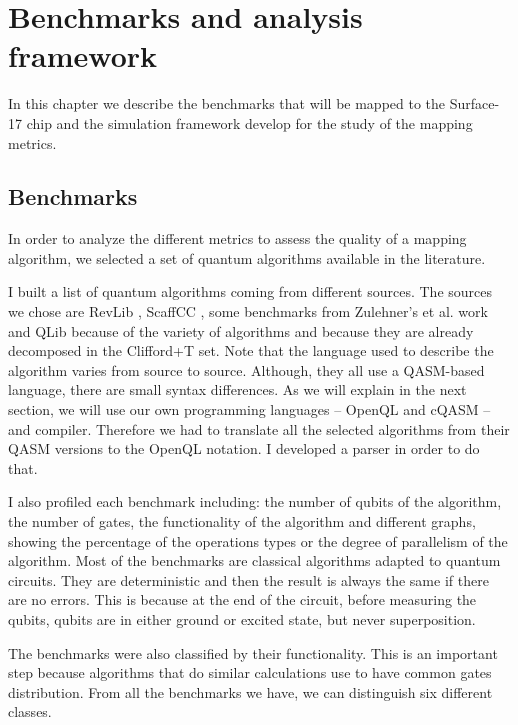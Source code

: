 
\chapter{Benchmarks and analysis framework}
\label{sec:org17c0cef}

In this chapter we describe the benchmarks that will be mapped to the Surface-17 chip and the simulation framework develop for the study of the mapping metrics.

\section{Benchmarks}
\label{sec:orga02804b}
In order to analyze the different metrics to assess the quality of a mapping algorithm, we selected a set of quantum algorithms available in the literature.

I built a list of quantum algorithms coming from different sources.
The sources we chose are RevLib \cite{Wille_2008}, ScaffCC \cite{JavadiAbhari_2015}, some benchmarks from Zulehner's et al. work \cite{zulehner17:effic_method_mappin_quant_circuit} and QLib \cite{Lin_2014} because of the variety of algorithms and because they are already decomposed in the Clifford+T set.
Note that the language used to describe the algorithm varies from source to source.
Although, they all use a  QASM-based language, there are small syntax differences.
As we will explain in the next section, we will use our own programming languages -- OpenQL and cQASM -- and compiler.
Therefore we had to translate all the selected algorithms from their QASM versions to the OpenQL notation.
I developed a parser in order to do that.

I also profiled each benchmark including: the number of qubits of the algorithm, the number of gates, the functionality of the algorithm and different graphs, showing the percentage of the operations types or the degree of parallelism of the algorithm.
Most of the benchmarks are classical algorithms adapted to quantum circuits.
They are deterministic and then the result is always the same if there are no errors.
This is because  at the end of the circuit, before measuring the qubits, qubits are in either ground or excited state, but never superposition.


The benchmarks were also classified by their functionality.
This is an important step because algorithms that do similar calculations use to have common gates distribution.
From all the benchmarks we have, we can distinguish six different classes.


